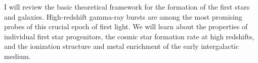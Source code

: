 


\bigskip



\bigskip

\noindent I will review the basic theoretical framework for the formation of the first stars and galaxies. High-redshift gamma-ray bursts are among the most promising probes of this crucial epoch of first light. We will learn about the properties of individual first star progenitors, the cosmic star formation rate at high redshifts, and the ionization structure and metal enrichment of the early intergalactic medium.


